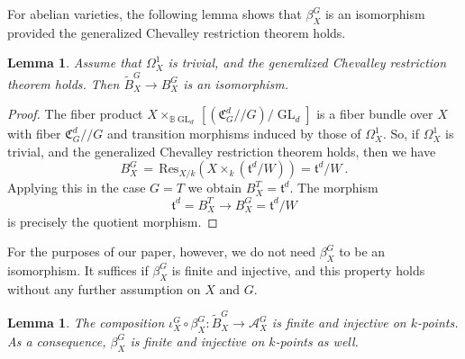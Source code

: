 \documentclass[11pt, a4paper]{amsart}
\newtheorem{lemma}[theorem]{Lemma}
\theoremstyle{definition}
\theoremstyle{myitemstyle}
\newcommand{\Res}{{\mathrm{Res}}}
\newcommand{\mbb}[1]{\mathbb{#1}}
\DeclareMathOperator{\GL}{GL}
\newcommand{\equ}{\ensuremath{\,=\,}}
\begin{document}
For abelian varieties, the following lemma shows that $\beta_X^G$ is an isomorphism provided the generalized Chevalley  restriction theorem holds. 
 
\begin{lemma}\label{lem:trivial cotangent}
Assume that $\Omega^1_X$ is trivial, and the generalized Chevalley restriction theorem holds. Then $\widetilde B^G_X\to B^G_X$ is an isomorphism.    
\end{lemma}
\begin{proof}
The fiber product $X\times_{\mbb B\GL_d} [(\mathfrak C_G^d/\!\!/G)/\GL_d]$ is a fiber bundle over $X$ with fiber $\mathfrak C_G^d/\!\!/G$ and transition morphisms induced by those of $\Omega^1_X$. So, if $\Omega^1_X$ is trivial, and the generalized Chevalley restriction theorem holds, then  we have
\[
    B^G_X  \equ  \Res_{X/k}(X\times_k (\mathfrak t^d/W))= \mathfrak t^d/W\ .
\]
Applying this in the case $G=T$ we obtain $B^T_X= \mathfrak t^d$. The morphism 
\[
    \mathfrak t^d=B^T_X\to B^G_X=\mathfrak t^d/W
\]
is precisely the quotient morphism.
\end{proof}

For the purposes of our paper, however, we do not need $\beta_X^G$ to be an isomorphism. It suffices if  $\beta_X^G$ is finite and injective, and this property holds without any further assumption on $X$ and $G$.

\begin{lemma}\label{lem:finiteinjectivebetaxg}
The composition $\iota_X^G\circ \beta_X^G\colon\widetilde B_X^G\rightarrow \mathcal{A}_X^G$ is finite and injective on $k$-points. As a consequence,   $\beta_X^G$ is finite and injective on $k$-points as well.
\end{lemma}
\end{document}
